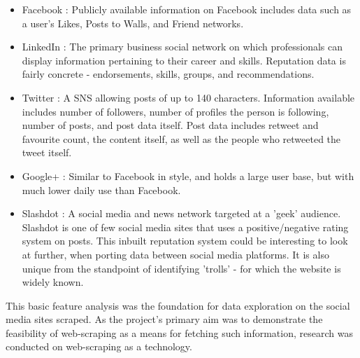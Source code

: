 






\begin{itemize}

\item Facebook \cite{facebook_site}: Publicly available information on Facebook includes data such as a user's Likes, Posts to Walls, and Friend networks. 
\item LinkedIn \cite{linkedin_site}: The primary business social network on which professionals can display information pertaining to their career and skills. Reputation data is fairly concrete - endorsements, skills, groups, and recommendations. 
\item Twitter \cite{twitter_site}: A SNS allowing posts of up to 140 characters. Information available includes number of followers, number of profiles the person is following, number of posts, and post data itself. Post data includes retweet and favourite count, the content itself, as well as the people who retweeted the tweet itself. 
\item Google+ \cite{google_site}: Similar to Facebook in style, and holds a large user base, but with much lower daily use than Facebook.
\item Slashdot \cite{slashdot_site}: A social media and news network targeted at a 'geek' audience. Slashdot is one of few social media sites that uses a positive/negative rating system on posts. This inbuilt reputation system could be interesting to look at further, when porting data between social media platforms. It is also unique from the standpoint of identifying 'trolls' - for which the website is widely known. 
\end{itemize}

This basic feature analysis was the foundation for data exploration on the social media sites scraped. As the project's primary aim was to demonstrate the feasibility of web-scraping as a means for fetching such information, research was conducted on web-scraping as a technology. 

